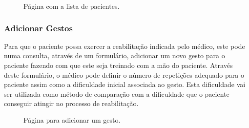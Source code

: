 \documentclass{TTUPhD}
\begin{document}
\begin{figure}[h!]
    \center
    \caption{Página com a lista de pacientes.}
    \label{fig:doctor2}
\end{figure}

\newpage


\subsubsection{Adicionar Gestos}

Para que o paciente possa exercer a reabilitação indicada pelo médico, este pode numa consulta, através de um formulário,
adicionar um novo gesto para o paciente fazendo com que este seja treinado com a mão do paciente. Através deste formulário, o médico pode definir o número de repetições adequado para o paciente assim como a dificuldade inicial associada ao gesto. Esta dificuldade vai ser utilizada como método de comparação com a dificuldade que o paciente conseguir atingir no processo de reabilitação.

\begin{figure}[h!]
    \center
    \caption{Página para adicionar um gesto.}
    \label{fig:doctor5}
\end{figure}
\newpage
\end{document}
